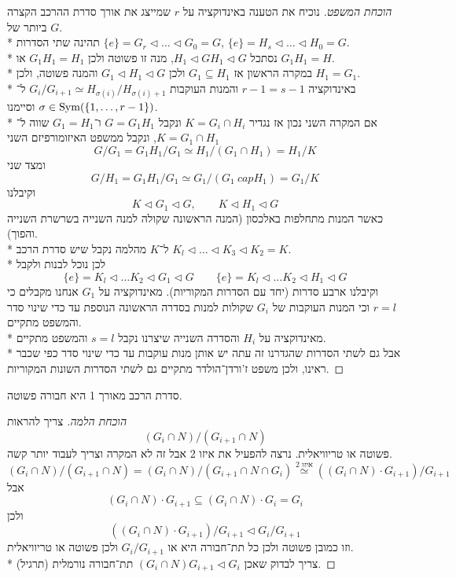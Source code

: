 \begin{proof}[הוכחת המשפט]
	נוכיח את הטענה באינדוקציה על $r$ שמייצג את אורך סדרת ההרכב הקצרה ביותר של $G$. \\*
	תהינה שתי הסדרות $\{e\} = G_r \triangleleft \dots \triangleleft G_0 = G$, $\{e\} = H_s \triangleleft \dots \triangleleft H_0 = G$. \\*
	נסתכל $H_1 \triangleleft GH_1 \triangleleft G$, מנה זו פשוטה ולכן $G_1 H_1 = H_1$ או $G_1 H_1 = H$. \\*
	במקרה הראשון אז $G_1 \subseteq H_1$ ולכן $G_1 \triangleleft H_1 \triangleleft G$ והמנה פשוטה, ולכן $H_1 = G_1$. \\*
	באינדוקציה $r - 1 = s - 1$ והמנות העוקבות $G_i / G_{i + 1} \simeq H_{\sigma(i)} / H_{\sigma(i) + 1}$ ל־$\sigma \in \operatorname{Sym}(\{1, \dots, r - 1\})$ וסיימנו. \\*
	אם המקרה השני נכון אז נגדיר $K = G_i \cap H_i$ ונקבל $G = G_1 H_1$ ו־$G_1 = H_1$ שווה ל־$K = G_1 \cap H_1$, ונקבל ממשפט האיזומורפיזם השני
	\[
		G / G_1 = G_1 H_1 / G_1 \simeq H_1 / (G_1 \cap H_1) = H_1 / K
	\]
	ומצד שני
	\[
		G / H_1 = G_1 H_1 / G_1 \simeq G_1 / (G_1 \ cap H_1) = G_1 / K
	\]
	וקיבלנו
	\[
		K \triangleleft G_1 \triangleleft G,
		\qquad
		K \triangleleft H_1 \triangleleft G
	\]
	כאשר המנות מתחלפות באלכסון (המנה הראשונה שקולה למנה השנייה בשרשרת השנייה והפוך). \\*
	ל־$K$ מהלמה נקבל שיש סדרת הרכב $K_l \triangleleft \dots \triangleleft K_3 \triangleleft K_2 = K$. \\*
	לכן נוכל לבנות ולקבל
	\[
		\{e\} = K_l \triangleleft \dots K_2 \triangleleft G_1 \triangleleft G
		\qquad
		\{e\} = K_l \triangleleft \dots K_2 \triangleleft H_1 \triangleleft G
	\]
	וקיבלנו ארבע סדרות (יחד עם הסדרות המקוריות).
	מאינדוקציה על $G_1$ אנחנו מקבלים כי $r = l$ וכי המנות העוקבות של $G_i$ שקולות למנות בסדרה הראשונה הנוספת עד כדי שינוי סדר והמשפט מתקיים. \\*
	מאינדוקציה על $H_i$ והסדרה השנייה שיצרנו נקבל $s = l$ והמשפט מתקיים. \\*
	אבל גם לשתי הסדרות שהגדרנו זה עתה יש אותן מנות עוקבות עד כדי שינוי סדר כפי שכבר ראינו, ולכן משפט ז'ורדן־הולדר מתקיים גם לשתי הסדרות השונות המקוריות.
\end{proof}
סדרת הרכב מאורך 1 היא חבורה פשוטה.
\begin{proof}[הוכחת הלמה]
	צריך להראות
	\[
		(G_i \cap N) / (G_{i + 1} \cap N)
	\]
	פשוטה או טריוויאלית.
	נרצה להפעיל את איזו 2 אבל זה לא המקרה וצריך לעבוד יותר קשה.
	\[
		(G_i \cap N) / (G_{i + 1} \cap N)
		= (G_i \cap N) / (G_{i + 1} \cap N \cap G_i)
		\overset{\text{איזו 2}}{\simeq}
		((G_i \cap N) \cdot G_{i + 1}) / G_{i + 1}
	\]
	אבל
	\[
		(G_i \cap N) \cdot G_{i + 1} \subseteq (G_i \cap N) \cdot G_i = G_i
	\]
	ולכן
	\[
		((G_i \cap N) \cdot G_{i + 1}) / G_{i + 1}
		\triangleleft
		G_i / G_{i + 1}
	\]
	וזו כמובן פשוטה ולכן כל תת־חבורה היא או $G_i / G_{i + 1}$ ולכן פשוטה או טריוויאלית. \\*
	צריך לבדוק שאכן $(G_i \cap N) G_{i + 1} \triangleleft G_i$ תת־חבורה נורמלית (תרגיל).
\end{proof}

